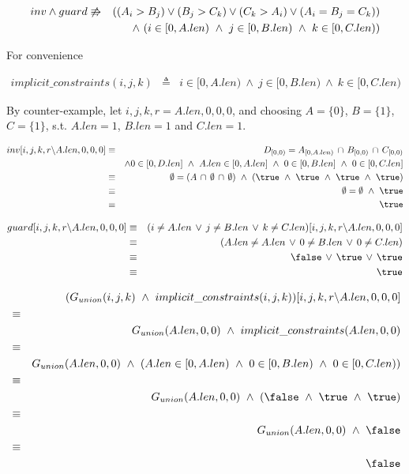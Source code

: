\documentclass[a4paper]{article}
\newcommand{\DOGUARD}[3]{({#1} \neq A.len\, \lor\, {#2} \neq B.len\, \lor\, {#3} \neq C.len)}
\newcommand{\INTERSECTION}[4]{D_{[0, {#1})} = A_{[0, {#2})}\, \cap\, B_{[0, {#3})}\, \cap\, C_{[0, {#4})}}
\newcommand{\BOUNDED}[4]{{#1} \in [0, D.len] ~\land~ {#2} \in [0, A.len] ~\land~ {#3} \in [0, B.len] ~\land~ {#4} \in [0, C.len]}
\newcommand{\BOUNDEDNONINCLUSIVE}[3]{{#1} \in [0, A.len) ~\land~ {#2} \in [0, B.len) ~\land~ {#3} \in [0, C.len)}
\newcommand{\IFGUARD}{(A_i > B_j) \lor (B_j > C_k) \lor (C_k > A_i) \lor (A_i = B_j = C_k)}
\newcommand{\SUBSTITUTION}{[i, j, k, r \backslash A.len, 0, 0, 0]}
\begin{document}
\begin{eqnarray*}
inv \land guard  & \not\entails & (\IFGUARD)\\
    && \land~ (\BOUNDEDNONINCLUSIVE{i}{j}{k})
\end{eqnarray*}

For convenience

\begin{eqnarray*}
implicit\_constraints(i, j, k) & \triangleq & \BOUNDEDNONINCLUSIVE{i}{j}{k}
\end{eqnarray*}


By counter-example, let $i, j, k, r = A.len, 0, 0, 0$, and choosing $A = \{0\}$, $B = \{1\}$, $C = \{1\}$, s.t. $A.len = 1$, $B.len = 1$ and $C.len = 1$.

\begin{eqnarray*}
inv\SUBSTITUTION & \equiv & \INTERSECTION{0}{A.len}{0}{0}\\
    && \land \BOUNDED{0}{A.len}{0}{0}\\
    & \equiv & \emptyset = (A\, \cap\, \emptyset\, \cap\, \emptyset) ~\land~ (\true ~\land~ \true ~\land~ \true ~\land~ \true)\\
    & \equiv & \emptyset = \emptyset ~\land~ \true\\
    & \equiv & \true
\end{eqnarray*} 

\begin{eqnarray*}
guard\SUBSTITUTION & \equiv & \DOGUARD{i}{j}{k}\SUBSTITUTION\\
    & \equiv & \DOGUARD{A.len}{0}{0}\\
    & \equiv & \false\, \lor\, \true\, \lor\, \true\\
    & \equiv & \true
\end{eqnarray*} 

\begin{eqnarray*}
&& (G_{union}(i, j, k) ~\land~ implicit\_constraints(i, j, k))\SUBSTITUTION\\
& \equiv &\\
&& G_{union}(A.len, 0, 0) ~\land~ implicit\_constraints(A.len, 0, 0)\\
& \equiv &\\
&& G_{union}(A.len, 0, 0) ~\land~ (\BOUNDEDNONINCLUSIVE{A.len}{0}{0})\\
& \equiv &\\
&& G_{union}(A.len, 0, 0) ~\land~ (\false ~\land~ \true ~\land~ \true)\\
& \equiv &\\
&& G_{union}(A.len, 0, 0) ~\land~ \false\\
& \equiv &\\
&& \false
\end{eqnarray*}
\end{document}
